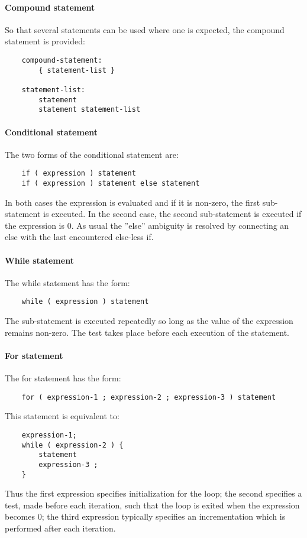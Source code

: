 \documentclass[a4paper]{article}
\begin{document}
\paragraph{Compound statement}
So that several statements can be used where one is expected, the compound statement is provided:
\begin{verbatim}
    compound-statement:
        { statement-list }

    statement-list:
        statement
        statement statement-list
\end{verbatim}

\paragraph{Conditional statement}
The two forms of the conditional statement are:
\begin{verbatim}
    if ( expression ) statement
    if ( expression ) statement else statement
\end{verbatim}
In both cases the expression is evaluated and if it is non-zero, the first sub-statement is executed. In the second case, the second sub-statement is executed if the expression is 0. As usual the ''else'' ambiguity is resolved by connecting an else with the last encountered else-less if.

\paragraph{While statement}
The while statement has the form:
\begin{verbatim}
    while ( expression ) statement
\end{verbatim}
The sub-statement is executed repeatedly so long as the value of the expression remains non-zero. The test takes place before each execution of the statement.

\paragraph{For statement}
The for statement has the form:
\begin{verbatim}
    for ( expression-1 ; expression-2 ; expression-3 ) statement
\end{verbatim}
This statement is equivalent to:
\begin{verbatim}
    expression-1;
    while ( expression-2 ) {
        statement
        expression-3 ;
    }
\end{verbatim}
Thus the first expression specifies initialization for the loop; the second specifies a test, made before each iteration, such that the loop is exited when the expression becomes 0; the third expression typically specifies an incrementation which is performed after each iteration.
\end{document}
